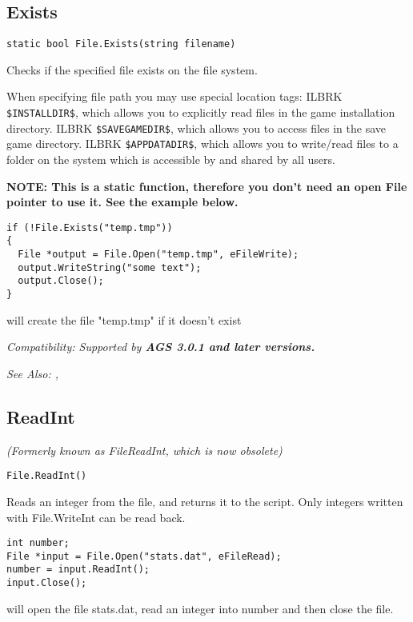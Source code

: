 \subsection{Exists}\label{File.Exists}%

\begin{verbatim}
static bool File.Exists(string filename)
\end{verbatim}
Checks if the specified file exists on the file system.

When specifying file path you may use special location tags: ILBRK
\verb^$INSTALLDIR$^, which allows you to explicitly read files in the game installation directory. ILBRK
\verb^$SAVEGAMEDIR$^, which allows you to access files in the save game directory. ILBRK
\verb^$APPDATADIR$^, which allows you to write/read files to a folder on the system which
is accessible by and shared by all users.

\bf{NOTE:} This is a static function, therefore you don't need an open File pointer
to use it. See the example below.

\begin{verbatim}
if (!File.Exists("temp.tmp"))
{
  File *output = File.Open("temp.tmp", eFileWrite);
  output.WriteString("some text");
  output.Close();
}
\end{verbatim}
will create the file "temp.tmp" if it doesn't exist

\it{Compatibility:} Supported by \bf{AGS 3.0.1} and later versions.

\it{See Also:} , 


\subsection{ReadInt}\label{File.ReadInt}%

\it{(Formerly known as FileReadInt, which is now obsolete)}

\begin{verbatim}
File.ReadInt()
\end{verbatim}
Reads an integer from the file, and returns it to the script.
Only integers written with File.WriteInt can be read back.

\begin{verbatim}
int number;
File *input = File.Open("stats.dat", eFileRead);
number = input.ReadInt();
input.Close();
\end{verbatim}
will open the file stats.dat, read an integer into number and then close the file.

